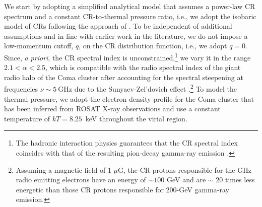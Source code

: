 \documentclass[12pt,manuscript]{aastex}
\newcommand{\rmn}{\mathrm}
\begin{document}
We start by adopting a simplified analytical model that assumes a power-law CR spectrum and a
constant CR-to-thermal pressure ratio, i.e., we adopt the isobaric model of CRs following
the approach of \citet{article:PfrommerEnsslin:2004b}. To be independent of additional assumptions
and in line with earlier work in the literature, we do not impose a low-momentum cutoff, $q$, on the
CR distribution function, i.e., we adopt $q=0$. Since, {\em a priori}, the CR spectral index is
unconstrained,\footnote{The hadronic interaction physics guarantees that the CR spectral index
coincides with that of the resulting pion-decay gamma-ray emission \citep[see discussion
in][]{article:PfrommerEnsslin:2004b}.} we vary it in the range $2.1<\alpha<2.5$, which is
compatible with the radio spectral index of the giant radio halo of the Coma cluster after
accounting for the spectral steepening at frequencies $\nu\sim5~\rmn{GHz}$ due to the
Sunyaev-Zel'dovich effect \citep{article:Ensslin:2002,
article:PfrommerEnsslin:2004b}.\footnote{Assuming a magnetic field of 1 $\mu$G, the CR protons
responsible for the GHz radio emitting electrons have an energy of $\sim100$ GeV and are $\sim$ 20
times less energetic than those CR protons responsible for 200-GeV gamma-ray emission.} To model
the thermal pressure, we adopt the electron density profile for the Coma cluster that has been
inferred from ROSAT X-ray observations \citep{article:BrielHenryBohringer:1992} and use a constant
temperature of $kT= 8.25$~keV throughout the virial region.
\end{document}

